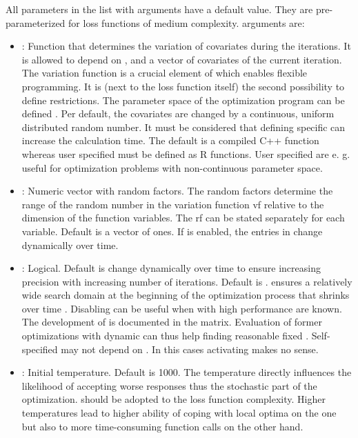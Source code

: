 All parameters in the list with  arguments have a default value. They are pre-parameterized for loss functions of medium complexity.  arguments are:
\begin{itemize}
	\item {}: Function that determines the variation of covariates during the iterations. It is allowed to depend on ,  and a vector of covariates of the current iteration. The variation function is a crucial element of  which enables flexible programming. It is (next to the loss function itself) the second possibility to define restrictions. The parameter space of the optimization program can be defined . Per default, the covariates are changed by a continuous, uniform distributed random number. It must be considered that defining specific  can increase the calculation time. The default  is a compiled C++ function whereas user specified  must be defined as R functions. User specified are e. g. useful for optimization problems with non-continuous parameter space.
	\item {}: Numeric vector with random factors. The random factors determine the range of the random number in the variation function vf relative to the dimension of the function variables. The rf can be stated separately for each variable. Default is a vector of ones. If  is enabled, the entries in  change dynamically over time.
	\item {}: Logical. Default is   change dynamically over time to ensure increasing precision with increasing number of iterations. Default is .  ensures a relatively wide search domain at the beginning of the optimization process that shrinks over time \citep{corana_1987, pronzato_1984}. Disabling  can be useful when  with high performance are known. The development of  is documented in the  matrix. Evaluation of former optimizations with dynamic  can thus help finding reasonable fixed . Self-specified  may not depend on . In this cases activating  makes no sense.
	\item {}: Initial temperature. Default is 1000. The temperature directly influences the likelihood of accepting worse responses thus the stochastic part of the optimization.  should be adopted to the loss function complexity. Higher temperatures lead to higher ability of coping with local optima on the one but also to more time-consuming function calls on the other hand.

\end{itemize}
